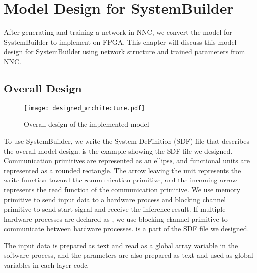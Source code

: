 
\chapter{Model Design for SystemBuilder} \label{sec:model_design}

After generating and training a network in NNC, we convert the model for SystemBuilder to implement on FPGA. This chapter will discuss this model design for SystemBuilder using network structure and trained parameters from NNC.

\section{Overall Design} \label{sec:overall_design}

\begin{figure}[tbp]
  \centering
  \texttt{[image: designed\_architecture.pdf]}
  \caption{Overall design of the implemented model}%
  \label{fig:designed_architecture}
\end{figure}

To use SystemBuilder, we write the System DeFinition (SDF) file that describes the overall model design.  is the example showing the SDF file we designed.
Communication primitives are represented as an ellipse, and functional units are represented as a rounded rectangle. The arrow leaving the unit represents the write function toward the communication primitive, and the incoming arrow represents the read function of the communication primitive. We use memory primitive to send input data to a hardware process and blocking channel primitive to send start signal and receive the inference result. If multiple hardware processes are declared as , we use blocking channel primitive to communicate between hardware processes.  is a part of the SDF file we designed.

The input data is prepared as text and read as a global array variable in the software process, and the parameters are also prepared as text and used as global variables in each layer code.




